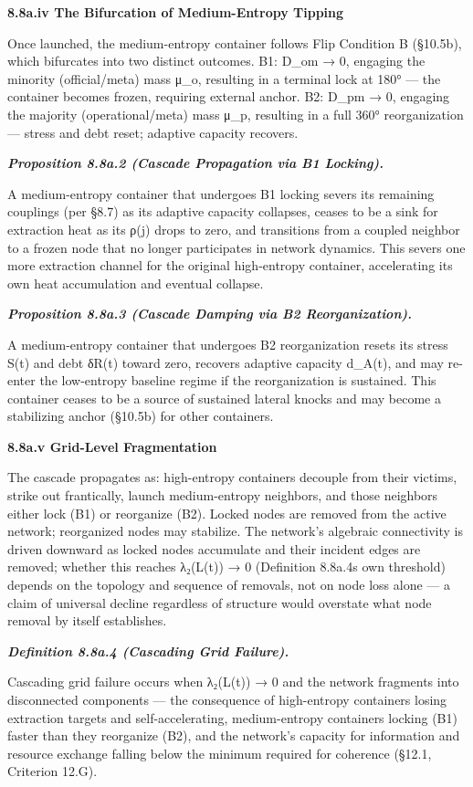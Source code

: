 \documentclass[
]{article}
\begin{document}
\textbf{8.8a.iv The Bifurcation of Medium-Entropy Tipping}

Once launched, the medium-entropy container follows Flip Condition B
(§10.5b), which bifurcates into two distinct outcomes. B1: D\_om → 0,
engaging the minority (official/meta) mass μ\_o, resulting in a terminal
lock at 180° --- the container becomes frozen, requiring external
anchor. B2: D\_pm → 0, engaging the majority (operational/meta) mass
μ\_p, resulting in a full 360° reorganization --- stress and debt reset;
adaptive capacity recovers.

\emph{\textbf{Proposition 8.8a.2 (Cascade Propagation via B1 Locking).}}

A medium-entropy container that undergoes B1 locking severs its
remaining couplings (per §8.7) as its adaptive capacity collapses,
ceases to be a sink for extraction heat as its ρ(j) drops to zero, and
transitions from a coupled neighbor to a frozen node that no longer
participates in network dynamics. This severs one more extraction
channel for the original high-entropy container, accelerating its own
heat accumulation and eventual collapse.

\emph{\textbf{Proposition 8.8a.3 (Cascade Damping via B2
Reorganization).}}

A medium-entropy container that undergoes B2 reorganization resets its
stress S(t) and debt δR(t) toward zero, recovers adaptive capacity
d\_A(t), and may re-enter the low-entropy baseline regime if the
reorganization is sustained. This container ceases to be a source of
sustained lateral knocks and may become a stabilizing anchor (§10.5b)
for other containers.

\textbf{8.8a.v Grid-Level Fragmentation}

The cascade propagates as: high-entropy containers decouple from their
victims, strike out frantically, launch medium-entropy neighbors, and
those neighbors either lock (B1) or reorganize (B2). Locked nodes are
removed from the active network; reorganized nodes may stabilize. The
network's algebraic connectivity is driven downward as locked nodes
accumulate and their incident edges are removed; whether this reaches
λ₂(L(t)) → 0 (Definition 8.8a.4s own threshold) depends on the topology
and sequence of removals, not on node loss alone --- a claim of
universal decline regardless of structure would overstate what node
removal by itself establishes.

\emph{\textbf{Definition 8.8a.4 (Cascading Grid Failure).}}

Cascading grid failure occurs when λ₂(L(t)) → 0 and the network
fragments into disconnected components --- the consequence of
high-entropy containers losing extraction targets and self-accelerating,
medium-entropy containers locking (B1) faster than they reorganize (B2),
and the network's capacity for information and resource exchange falling
below the minimum required for coherence (§12.1, Criterion 12.G).
\end{document}
